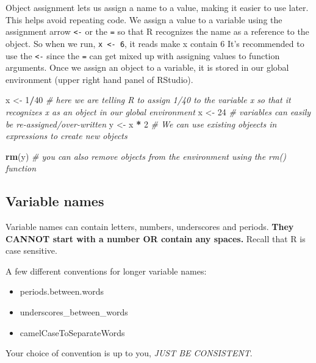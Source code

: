 \documentclass[
]{book}
\newenvironment{Shaded}{\begin{snugshade}}{\end{snugshade}}
\newcommand{\CommentTok}[1]{\textcolor[rgb]{0.56,0.35,0.01}{\textit{#1}}}
\newcommand{\DecValTok}[1]{\textcolor[rgb]{0.00,0.00,0.81}{#1}}
\newcommand{\FunctionTok}[1]{\textcolor[rgb]{0.13,0.29,0.53}{\textbf{#1}}}
\newcommand{\NormalTok}[1]{#1}
\newcommand{\OtherTok}[1]{\textcolor[rgb]{0.56,0.35,0.01}{#1}}
\newcommand{\SpecialCharTok}[1]{\textcolor[rgb]{0.81,0.36,0.00}{\textbf{#1}}}
\providecommand{\tightlist}{%
  \setlength{\itemsep}{0pt}\setlength{\parskip}{0pt}}
\begin{document}
Object assignment lets us assign a name to a value, making it easier to use later. This helps avoid repeating code. We assign a value to a variable using the assignment arrow \texttt{\textless{}-} or the \texttt{=} so that R recognizes the name as a reference to the object. So when we run, \texttt{x\ \textless{}-\ 6}, it reads make x contain 6 It's recommended to use the \texttt{\textless{}-} since the \texttt{=} can get mixed up with assigning values to function arguments. Once we assign an object to a variable, it is stored in our global environment (upper right hand panel of RStudio).

\begin{Shaded}
\begin{Highlighting}[]
\NormalTok{x }\OtherTok{\textless{}{-}} \DecValTok{1}\SpecialCharTok{/}\DecValTok{40} \CommentTok{\# here we are telling R to assign 1/40 to the variable x so that it recognizes x as an object in our global environment}
\NormalTok{x }\OtherTok{\textless{}{-}}  \DecValTok{24} \CommentTok{\# variables can easily be re{-}assigned/over{-}written}
\NormalTok{y }\OtherTok{\textless{}{-}}\NormalTok{ x }\SpecialCharTok{*} \DecValTok{2} \CommentTok{\# We can use existing objeects in expressions to create new objects}

\FunctionTok{rm}\NormalTok{(y) }\CommentTok{\# you can also remove objects from the environment using the rm() function}
\end{Highlighting}
\end{Shaded}

\subsection{Variable names}\label{variable-names}

Variable names can contain letters, numbers, underscores and periods.
\textbf{They CANNOT start with a number OR contain any spaces.} Recall that R is case sensitive.

A few different conventions for longer variable names:

\begin{itemize}
\tightlist
\item
  periods.between.words
\item
  underscores\_between\_words
\item
  camelCaseToSeparateWords
\end{itemize}

Your choice of convention is up to you, \emph{JUST BE CONSISTENT}.
\end{document}
